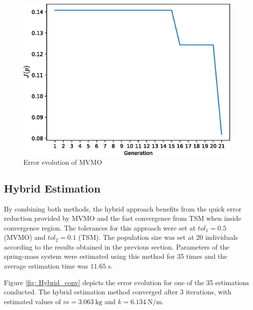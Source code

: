 \begin{figure}[h]
	\caption{Error evolution of MVMO}
	\begin{center}
		\includegraphics[scale=0.6]{Images/MVMO_conv.eps}
	\end{center}
	\label{fig: MVMO_conv}
\end{figure}

\subsection{Hybrid Estimation}

By combining both methods, the hybrid approach benefits from the quick error reduction provided by MVMO and the fast convergence from TSM when inside convergence region. The tolerances for this approach were set at $tol_{1} = 0.5$ (MVMO) and $tol_{2} = 0.1$ (TSM). The population size was set at 20 individuals according to the results obtained in the previous section. Parameters of the spring-mass system were estimated using this method for 35 times and the average estimation time was $11.65\ s$.

Figure \ref{fig: Hybrid_conv} depicts the error evolution for one of the 35 estimations conducted. The hybrid estimation method converged after 3 iterations, with estimated values of $m=3.063\ \text{kg}$ and $k=6.134\ \text{N/m}$.

